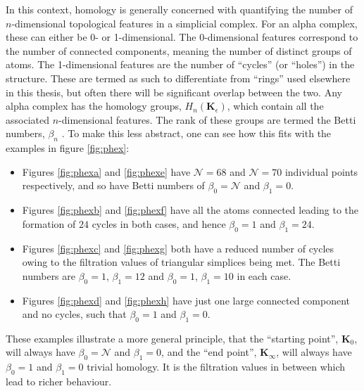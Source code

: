 In this context, homology is generally concerned with quantifying the number of $n$\--dimensional topological features in a simplicial complex.
For an alpha complex, these can either be 0\-- or 1\--dimensional.
The 0\--dimensional features correspond to the number of connected components, meaning the number of distinct groups of atoms.
The 1\--dimensional features are the number of ``cycles'' (or ``holes'') in the structure.
These are termed as such to differentiate from ``rings'' used elsewhere in this thesis, but often there will be significant overlap between the two.
Any alpha complex has the homology groups, $H_n\left(\mathbf{K}_\epsilon\right)$, which contain all the associated $n$\--dimensional features.
The rank of these groups are termed the Betti numbers, $\beta_n$ \cite{Zomorodian2005}.
To make this less abstract, one can see how this fits with the examples in figure \ref{fig:phex}:
\begin{itemize}
	\item Figures \ref{fig:phexa} and \ref{fig:phexe} have $\mathcal{N}=68$ and $\mathcal{N}=70$ individual points respectively, and so have Betti numbers of $\beta_0=\mathcal{N}$ and $\beta_1=0$.
	\item Figures \ref{fig:phexb} and \ref{fig:phexf} have all the atoms connected leading to the formation of $24$ cycles in both cases, and hence $\beta_0=1$ and $\beta_1=24$.
	\item Figures \ref{fig:phexc} and \ref{fig:phexg} both have a reduced number of cycles owing to the filtration values of triangular simplices being met. The Betti numbers are $\beta_0=1$, $\beta_1=12$ and $\beta_0=1$, $\beta_1=10$ in each case.
	\item Figures \ref{fig:phexd} and \ref{fig:phexh} have just one large connected component and no cycles, such that $\beta_0=1$ and $\beta_1=0$.
\end{itemize}
These examples illustrate a more general principle, that the ``starting point'', $\mathbf{K}_0$, will always have $\beta_0=\mathcal{N}$ and $\beta_1=0$, and the ``end point'', $\mathbf{K}_\infty$,  will always have $\beta_0=1$ and $\beta_1=0$ \ie{} trivial homology.
It is the filtration values in between which lead to richer behaviour.

